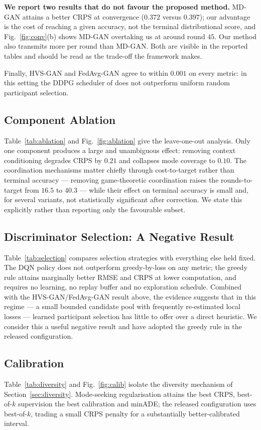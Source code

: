 \documentclass[journal]{IEEEtran}
\begin{document}
\textbf{We report two results that do not favour the proposed method.} MD-GAN
attains a better CRPS at convergence ($0.372$ versus $0.397$); our advantage is
the cost of reaching a given accuracy, not the terminal distributional score,
and Fig.~\ref{fig:conv}(b) shows MD-GAN overtaking us at around round $45$.
Our method also transmits more per round than MD-GAN. Both are visible in the
reported tables and should be read as the trade-off the framework makes.

Finally, HVS-GAN and FedAvg-GAN agree to within $0.001$ on every metric: in this
setting the DDPG scheduler of \cite{wu2024hvsgan} does not outperform uniform
random participant selection.

\subsection{Component Ablation}
Table~\ref{tab:ablation} and Fig.~\ref{fig:ablation} give the leave-one-out
analysis. Only one component produces a large and unambiguous effect: removing
context conditioning degrades CRPS by $0.21$ and collapses mode coverage to
$0.10$. The coordination mechanisms matter chiefly through cost-to-target rather
than terminal accuracy --- removing game-theoretic coordination raises the
rounds-to-target from $16.5$ to $40.3$ --- while their effect on terminal
accuracy is small and, for several variants, not statistically significant after
correction. We state this explicitly rather than reporting only the favourable
subset.

\subsection{Discriminator Selection: A Negative Result}
Table~\ref{tab:selection} compares selection strategies with everything else
held fixed. The DQN policy does not outperform greedy-by-loss on any metric; the
greedy rule attains marginally better RMSE and CRPS at lower computation, and
requires no learning, no replay buffer and no exploration schedule. Combined
with the HVS-GAN/FedAvg-GAN result above, the evidence suggests that in this
regime --- a small bounded candidate pool with frequently re-estimated local
losses --- learned participant selection has little to offer over a direct
heuristic. We consider this a useful negative result and have adopted the
greedy rule in the released configuration.

\subsection{Calibration}
Table~\ref{tab:diversity} and Fig.~\ref{fig:calib} isolate the diversity
mechanism of Section~\ref{sec:diversity}. Mode-seeking regularisation attains
the best CRPS, best-of-$k$ supervision the best calibration and minADE; the
released configuration uses best-of-$k$, trading a small CRPS penalty for a
substantially better-calibrated interval.
\end{document}
